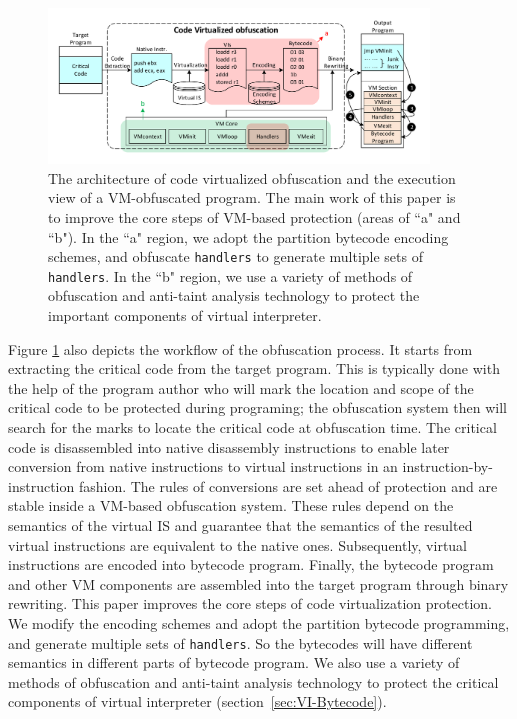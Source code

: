\begin{figure}[!t]
\centering
\includegraphics[width=0.9\textwidth]{fig/vmprotection.pdf}
\caption{The architecture of code virtualized obfuscation and the execution view of a VM-obfuscated program. The main work of this paper is to improve the core steps of VM-based protection (areas of ``a" and ``b"). In the ``a" region, we adopt the partition bytecode encoding schemes, and obfuscate \texttt{handlers} to generate multiple sets of \texttt{handlers}. In the ``b" region, we use a variety of methods of obfuscation and anti-taint analysis technology to protect the important components of virtual interpreter.}
\label{fig:vmprotection}
\end{figure}


Figure \ref{fig:vmprotection} also depicts the workflow of the obfuscation process. It starts from extracting the critical code from the target program. This is typically done with the help of the program author who will mark the location and scope of the critical code to be protected during programing; the obfuscation system then will search for the marks to locate the critical code at obfuscation time. The critical code is disassembled into native disassembly instructions to enable later conversion from native instructions to virtual instructions in an instruction-by-instruction fashion. The rules of conversions are set ahead of protection and are stable inside a VM-based obfuscation system. These rules depend on the semantics of the virtual IS and guarantee that the semantics of the resulted virtual instructions are equivalent to the native ones. Subsequently, virtual instructions are encoded into bytecode program. Finally, the bytecode program and other VM components are assembled into the target program through binary rewriting.
This paper improves the core steps of code virtualization protection. We modify the encoding schemes and adopt the partition bytecode programming, and generate multiple sets of \texttt{handlers}. So the bytecodes will have different semantics in different parts of bytecode program. We also use a variety of methods of obfuscation and anti-taint analysis technology to protect the critical components of virtual interpreter (section~\ref{sec:VI-Bytecode}).

